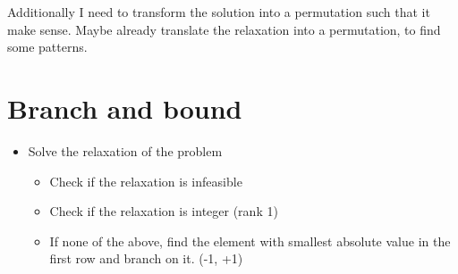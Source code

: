 \documentclass[a4paper]{article}
\begin{document}
Additionally I need to transform the solution into a permutation such that it make sense. Maybe already translate the relaxation into a permutation, to find some patterns. 

\section*{Branch and bound}

\begin{itemize}
    \item Solve the relaxation of the problem
    \begin{itemize}
        \item Check if the relaxation is infeasible
        \item Check if the relaxation is integer (rank 1)
        \item If none of the above, find the element with smallest absolute value in the first row and branch on it. (-1, +1)
    \end{itemize}
\end{itemize}
\end{document}
